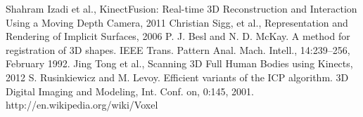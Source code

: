 \documentclass[12pt]{article}
\theoremstyle{plain}
\begin{document}
\begin{thebibliography}{widest entry}
   Shahram Izadi et al., KinectFusion: Real-time 3D
    Reconstruction and Interaction Using a Moving Depth Camera, 2011
   Christian Sigg, et
    al., Representation and Rendering of Implicit Surfaces, 2006
   P. J. Besl and N. D. McKay. A method for registration of 3D
    shapes. IEEE Trans. Pattern Anal. Mach. Intell., 14:239–256, February 1992. 
   Jing Tong et al., Scanning 3D Full Human Bodies using
    Kinects, 2012
   S. Rusinkiewicz and M. Levoy. Efficient variants of the
    ICP algorithm. 3D Digital Imaging and Modeling, Int.
    Conf. on, 0:145, 2001.
   http://en.wikipedia.org/wiki/Voxel
\end{thebibliography}

\hfill\\
\end{document}
